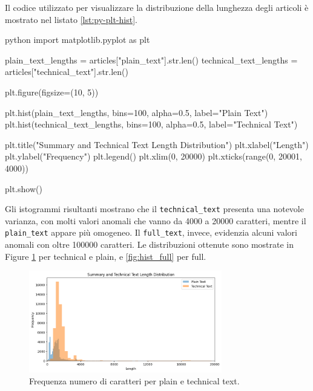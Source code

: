 \documentclass[12pt,a4paper,twoside,openright]{book}
\begin{document}
Il codice utilizzato per visualizzare la distribuzione della lunghezza degli articoli è mostrato nel listato \ref{lst:py-plt-hist}.

\begin{customcode}
\begin{mintedbox}{python}
import matplotlib.pyplot as plt

plain_text_lengths = articles["plain_text"].str.len()
technical_text_lengths = articles["technical_text"].str.len()

plt.figure(figsize=(10, 5))

plt.hist(plain_text_lengths, bins=100, alpha=0.5, label="Plain Text")
plt.hist(technical_text_lengths, bins=100, alpha=0.5, label="Technical Text")

plt.title("Summary and Technical Text Length Distribution")
plt.xlabel("Length")
plt.ylabel("Frequency")
plt.legend()
plt.xlim(0, 20000) 
plt.xticks(range(0, 20001, 4000)) 

plt.show()
\end{mintedbox}
\caption{Python script per visualizzare le distribuzioni di frequenza delle lunghezze degli articoli.}
\label{lst:py-plt-hist}
\end{customcode}

Gli istogrammi risultanti mostrano che il \texttt{technical\_text} presenta una notevole varianza, con molti valori anomali che vanno da 4000 a 20000 caratteri, mentre il \texttt{plain\_text} appare più omogeneo. Il \texttt{full\_text}, invece, evidenzia alcuni valori anomali con oltre 100000 caratteri.
Le distribuzioni ottenute sono mostrate in Figure \ref{fig:hist_tech_plain} per technical e plain, e \ref{fig:hist_full} per full.

\begin{figure}
    \centering
    \includegraphics[width=0.75\textwidth]{images/sum_tech_length_distrib.png}
    \caption{Frequenza numero di caratteri per plain e technical text.}
    \label{fig:hist_tech_plain}
\end{figure}
\end{document}
